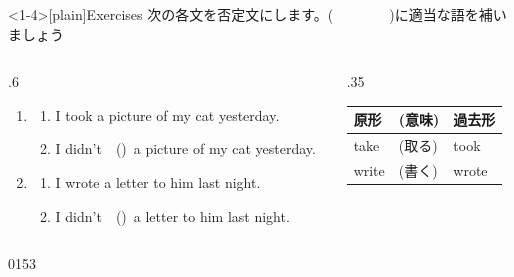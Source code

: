 \documentclass[aspectratio=169,xcolor={dvipsnames,table}]{beamer}
\newcommand{\myaudio}[1]{\href{#1}{\faVolumeUp}}
\begin{document}
\begin{frame}<1-4>[plain]{Exercises}
 次の各文を否定文にします。(~~~~~~~~)に適当な語を補いましょう

\begin{columns}
\begin{column}{.6\textwidth}
\begin{enumerate}
 \item \begin{enumerate}
	\item I took a picture of my cat yesterday.
	\item I didn't~~()\,\,\,a picture of my cat yesterday.
       \end{enumerate}
 \item \begin{enumerate}
	\item I wrote a letter to him last night.
	\item I didn't~~()\,\,\,a letter to him last night.
       \end{enumerate}
\end{enumerate}
\end{column}
\begin{column}{.35\textwidth}
{
\begin{tabular}{lll}\toprule
{\small 原形}&{\small (意味)}&{\small 過去形}\\\midrule
{take}&{{\small (取る)}}&{took}\\
{write}&{{\small (書く)}}&{wrote}\\
\bottomrule
\end{tabular}}%

\end{column}
\end{columns}
\hfill{\tiny 0153}\,{\scriptsize \myaudio{./audio/026_past_didnot_08.mp3}}

\end{frame}
\end{document}
